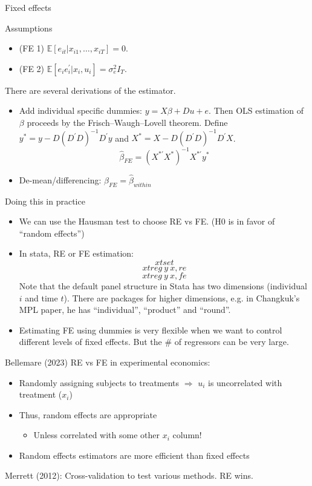 \begin{frame}{Fixed effects}
\begin{block}{Assumptions}
    \begin{itemize}
\item[](FE 1) $\mathbb{E}[e_{it}|x_{i1},\ldots,x_{iT}]=0$.
\item[](FE 2) $\mathbb{E}[e_{i}e^{\prime}_{i}|x_{i},u_{i}]=\sigma_{e}^{2}I_{T}$.
\end{itemize}
\end{block}
There are several derivations of the estimator.
\begin{itemize}
    \item Add individual specific dummies: $y=X\beta+Du+e$. Then OLS estimation of $\beta$ proceeds by the Frisch–Waugh–Lovell theorem.
    Define $y^* =y-D\left(D^{\prime} D\right)^{-1} D^{\prime} y$ and $X^*  =X-D\left(D^{\prime} D\right)^{-1} D^{\prime} X$.
    $$\hat{\beta}_{FE}=(X^{*\prime}X^{*})^{-1}X^{*\prime}y^*$$
    \item De-mean/differencing: $\hat{\beta}_{FE}=\hat{\beta}_{within}$
\end{itemize}
\end{frame}

\begin{frame}{Doing this in practice}
\begin{itemize}
    \item We can use the Hausman test to choose RE vs FE. (H0 is in favor of ``random effects'')
    \item In stata, RE or FE estimation:
    $$xtset$$
    $$xtreg ~y~x,re$$
    $$xtreg ~y~x,fe$$
    Note that the default panel structure in Stata has two dimensions (individual $i$ and time $t$). There are packages for higher dimensions, e.g. in Changkuk's MPL paper, he has ``individual'', ``product'' and ``round''.
    \item Estimating FE using dummies is very flexible when we want to control different levels of fixed effects. But the \# of regressors can be very large.
\end{itemize}
\end{frame}

\begin{frame}{Bellemare (2023)}
RE vs FE in experimental economics:
    \begin{itemize}
        \item Randomly assigning subjects to treatments $\Rightarrow$ $u_i$ is uncorrelated with treatment ($x_i$)
        \item Thus, random effects are appropriate
        \begin{itemize}
            \item Unless correlated with some other $x_i$ column!
        \end{itemize}
        \item Random effects estimators are more efficient than fixed effects
    \end{itemize}
\br
Merrett (2012): Cross-validation to test various methods. RE wins.
\end{frame}

